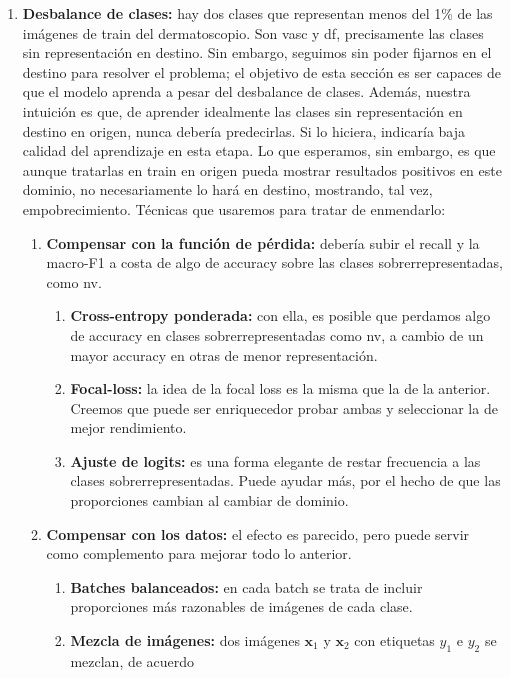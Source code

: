 \documentclass[10pt,a4paper]{article}
\renewcommand{\_}{\guionbajo\allowbreak}
\begin{document}
\begin{enumerate}
    \item \textbf{Desbalance de clases:} hay dos clases que representan menos del 1\% de las imágenes de train del dermatoscopio. 
    Son vasc y df, precisamente las clases sin representación en destino. Sin embargo, seguimos sin poder fijarnos en el destino 
    para resolver el problema; el objetivo de esta sección es ser capaces de que el modelo aprenda a pesar del desbalance de clases.
    Además, nuestra intuición es que, de aprender idealmente las clases sin representación en destino en origen, nunca debería predecirlas. 
    Si lo hiciera, indicaría baja calidad del aprendizaje en esta etapa. Lo que esperamos, sin embargo, es que aunque tratarlas en train en 
    origen pueda mostrar resultados positivos en este dominio, no necesariamente lo hará en destino, mostrando, tal vez, empobrecimiento. 
    Técnicas que usaremos para tratar de enmendarlo:
    \begin{enumerate}
        \item \textbf{Compensar con la función de pérdida:} debería subir el recall y la macro-F1 a costa de algo de accuracy sobre las clases
        sobrerrepresentadas, como nv. 
        \begin{enumerate}
            \item \textbf{Cross-entropy ponderada:} con ella, es posible que perdamos algo de accuracy en clases sobrerrepresentadas como nv, 
            a cambio de un mayor accuracy en otras de menor representación. 
            \item \textbf{Focal-loss:} la idea de la focal loss es la misma que la de la anterior. Creemos que puede ser enriquecedor probar ambas
            y seleccionar la de mejor rendimiento. 
            \item \textbf{Ajuste de logits:} es una forma elegante de restar frecuencia a las clases sobrerrepresentadas. 
            Puede ayudar más, por el hecho de que las proporciones cambian al cambiar de dominio. 
        \end{enumerate}
        \item \textbf{Compensar con los datos:} el efecto es parecido, pero puede servir como complemento para mejorar todo lo anterior. 
            \begin{enumerate}
                \item \textbf{Batches balanceados:} en cada batch se trata de incluir proporciones más razonables de imágenes de cada clase. 
                \item \textbf{Mezcla de imágenes:} dos imágenes $\textbf{x}_1$ y $\textbf{x}_2$ con etiquetas $y_1$ e $y_2$ se mezclan, de acuerdo 

\end{enumerate}
\end{enumerate}
\end{enumerate}
\end{document}
